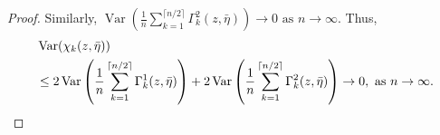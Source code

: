 \documentclass[10pt,a4paper]{amsart}
\newcommand{\Var}{\operatorname{Var}}
\begin{document}
\begin{proof}
Similarly, $ \Var\left(\frac{1}{n} \sum_{k=1}^{\lceil n/2 \rceil} \Gamma_{k}^2(z, \bar{\eta})\right) \rightarrow 0 \text{ as } n \rightarrow \infty.$ Thus,
\begin{align}
    &\Var(\chi_{k}(z, \bar{\eta}))\notag\\
    &\leq   2\Var\left(\frac{1}{n} \sum_{k=1}^{\lceil n/2 \rceil} \Gamma_{k}^1(z, \bar{\eta})\right)+2\Var\left(\frac{1}{n} \sum_{k=1}^{\lceil n/2 \rceil} \Gamma_{k}^2(z, \bar{\eta})\right) 
     \rightarrow 0, \text { as } n\rightarrow \infty .\notag
\end{align}

\end{proof}
\end{document}
